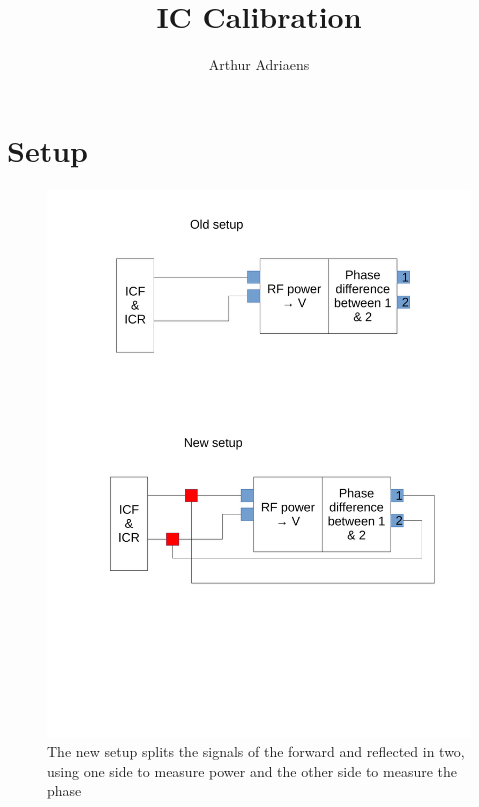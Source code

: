 \documentclass{report}
\title{IC Calibration}
\author{Arthur Adriaens}
\begin{document}
\maketitle

\section{Setup}
\begin{figure}
\includegraphics[width=\textwidth]{setup.pdf}
\caption{The new setup splits the signals of the forward and reflected in two, using one side to measure power and the other side to measure the phase}
\end{figure}
\end{document}
